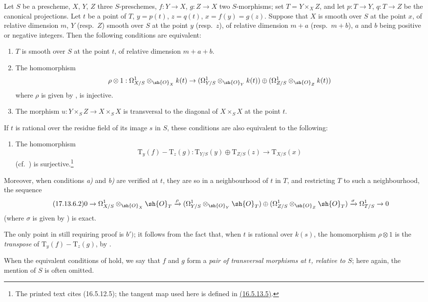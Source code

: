 \begin{corollary}[17.13.6]
\label{IV.17.13.6}
Let $S$ be a prescheme, $X$, $Y$, $Z$ three $S$-preschemes, $f:Y\to X$, $g:Z\to X$ two $S$-morphisms; set $T=Y\times_X Z$, and let $p:T\to Y$, $q:T\to Z$ be the canonical projections.
Let $t$ be a point of $T$, $y=p(t)$, $z=q(t)$, $x=f(y)=g(z)$.
Suppose that $X$ is smooth over $S$ at the point $x$, of relative dimension $m$, $Y$ (resp.\ $Z$) smooth over $S$ at the point $y$ (resp.\ $z$), of relative dimension $m+a$ (resp.\ $m+b$), $a$ and $b$ being positive or negative integers.
Then the following conditions are equivalent:
\begin{enumerate}[label=\alph*)]
  \item $T$ is smooth over $S$ at the point $t$, of relative dimension $m+a+b$.
  \item The homomorphism
  \[
    \rho\otimes 1: \Omega^1_{X/S}\otimes_{\sh{O}_X}k(t) \to (\Omega^1_{Y/S}\otimes_{\sh{O}_Y}k(t))\oplus(\Omega^1_{Z/S}\otimes_{\sh{O}_Z}k(t))
  \]
  where $\rho$ is given by , is injective.
  \item The morphism $u:Y\times_S Z\to X\times_S X$ is transversal to the diagonal of $X\times_S X$ at the point $t$.
\end{enumerate}
If $t$ is rational over the residue field of its image $s$ in $S$, these conditions are also equivalent to the following:
\begin{enumerate}
  \item[b${}'$)] The homomorphism
  \[
  \label{IV.17.13.6.1}
  \tag{17.13.6.1}
    \mathrm{T}_y(f)-\mathrm{T}_z(g): \mathrm{T}_{Y/S}(y)\oplus\mathrm{T}_{Z/S}(z) \to \mathrm{T}_{X/S}(x)
  \]
  (cf.\ ) is surjective.\footnote{The printed text cites (16.5.12.5); the tangent map used here is defined in {\hyperlink{ega4.c04.eq.16-5-13-5}{(16.5.13.5)}}.}
\end{enumerate}
Moreover, when conditions \emph{a)} and \emph{b)} are verified at $t$, they are so in a neighbourhood of $t$ in $T$, and restricting $T$ to such a neighbourhood, the sequence
\[
\label{IV.17.13.6.2}
\tag{17.13.6.2}
  0 \to \Omega^1_{X/S}\otimes_{\sh{O}_X}\sh{O}_T \xrightarrow{\rho} (\Omega^1_{Y/S}\otimes_{\sh{O}_Y}\sh{O}_T)\oplus(\Omega^1_{Z/S}\otimes_{\sh{O}_Z}\sh{O}_T) \xrightarrow{\sigma} \Omega^1_{T/S} \to 0
\]
(where $\sigma$ is given by ) is exact.

The only point in  still requiring proof is $b')$; it follows from the fact that, when $t$ is rational over $k(s)$, the homomorphism $\rho\otimes1$ is the \emph{transpose} of $\mathrm{T}_y(f)-\mathrm{T}_z(g)$, by .

When the equivalent conditions of  hold, we say that $f$ and $g$ form a \emph{pair of transversal morphisms at $t$, relative to $S$}; here again, the mention of $S$ is often omitted.
\end{corollary}

